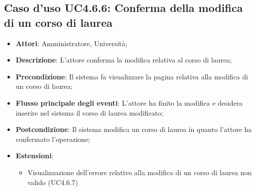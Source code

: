 \subsection{Caso d'uso \texorpdfstring{UC4.6.6}{UC4.6.6}: Conferma della modifica di un corso di laurea}
\begin{itemize}
\item \textbf{Attori}: Amministratore, Università;
\item \textbf{Descrizione}: L'attore conferma la modifica relativa al corso di laurea;

\item \textbf{Precondizione}: Il sistema fa visualizzare la pagina relativa alla modifica di un corso di laurea;


\item \textbf{Flusso principale degli eventi}: L'attore ha finito la modifica e desidera inserire nel sistema il corso di laurea modificato;

\item \textbf{Postcondizione}: Il sistema modifica un corso di laurea in quanto l'attore ha confermato l'operazione;

\item \textbf{Estensioni}:
\begin{itemize}
\item Visualizzazione dell'errore relativo alla modifica di un corso di laurea non valido (UC4.6.7)
\end{itemize}
\end{itemize}
